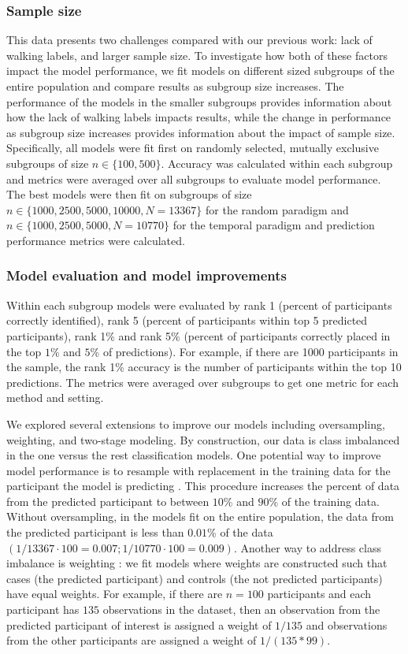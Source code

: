 \subsubsection{Sample size}
This data presents two challenges compared with our previous work: lack of walking labels, and larger sample size. To investigate how both of these factors impact the model performance, we fit models on different sized subgroups of the entire population and compare results as subgroup size increases. The performance of the models in the smaller subgroups provides information about how the lack of walking labels impacts results, while the change in performance as subgroup size increases provides information about the impact of sample size. Specifically, all models were fit first on randomly selected, mutually exclusive subgroups of size $n \in \{100, 500\}$. Accuracy was calculated within each subgroup and metrics were averaged over all subgroups to evaluate model performance. The best models were then fit on subgroups of size $n \in \{1000, 2500, 5000, 10000, N = 13367\}$ for the random paradigm and  $n \in \{1000, 2500, 5000, N = 10770\}$ for the temporal paradigm and prediction performance metrics were calculated.


\subsubsection{Model evaluation and model improvements}\label{subsubsec:sensitivity} 
Within each subgroup models were evaluated by rank 1 (percent of participants correctly identified), rank 5 (percent of participants within top 5 predicted participants), rank 1\% and rank 5\% (percent of participants correctly placed in the top $1$\% and $5$\% of predictions). For example, if there are 1000 participants in the sample, the rank 1\% accuracy is the number of participants within the top 10 predictions. The metrics were averaged over subgroups to get one metric for each method and setting. 

We explored several extensions to improve our models including oversampling, weighting, and two-stage modeling. By construction, our data is class imbalanced in the one versus the rest classification models. One potential way to improve model performance is to resample with replacement in the training data for the participant the model is predicting \citep{oversampling}. This procedure increases the percent of data from the predicted participant to between $10$\% and $90$\% of the training data. Without oversampling, in the models fit on the entire population, the data from the predicted participant is less than $0.01$\% of the data $(1/13367 \cdot 100 = 0.007; 1/10770 \cdot 100 = 0.009)$. Another way to address class imbalance is weighting \citep{weighting}: we fit models where weights are constructed such that cases (the predicted participant) and controls (the not predicted participants) have equal weights. For example, if there are $n=100$ participants and each participant has $135$ observations in the dataset, then an observation from the predicted participant of interest is assigned a weight of $1/135$ and observations from the other participants are assigned a weight of $1/(135 * 99)$. 

